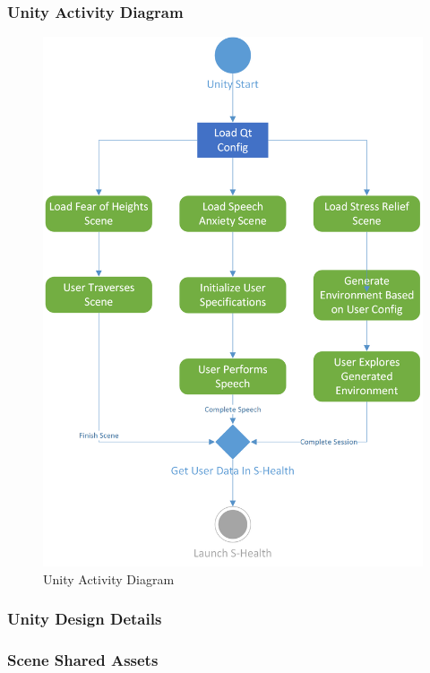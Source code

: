 \documentclass[a4paper,10pt]{article}
\begin{document}
		\subsubsection{Unity Activity Diagram}
				\begin{figure}[H]
					\centerline{\includegraphics[]{unityActivityDiag.png}}
					\caption{Unity Activity Diagram}
					\label{fig:unityactivity}
				\end{figure}
				\pagebreak
		\subsubsection{Unity Design Details}		
		\pagebreak
		\subsubsection{Scene Shared Assets}
\end{document}
